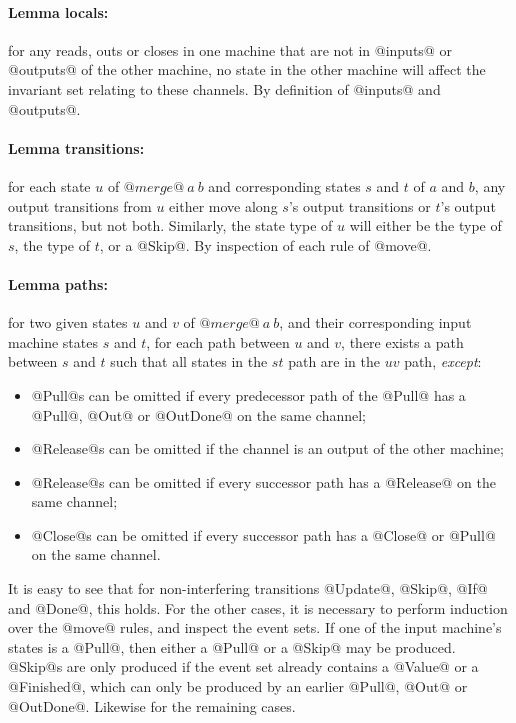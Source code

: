 \paragraph{Lemma locals:} for any reads, outs or closes in one machine that are not in @inputs@ or @outputs@ of the other machine, no state in the other machine will affect the invariant set relating to these channels.
By definition of @inputs@ and @outputs@.

\paragraph{Lemma transitions:} for each state $u$ of $@merge@~a~b$ and corresponding states $s$ and $t$ of $a$ and $b$, any output transitions from $u$ either move along $s$'s output transitions or $t$'s output transitions, but not both.
Similarly, the state type of $u$ will either be the type of $s$, the type of $t$, or a @Skip@.
By inspection of each rule of @move@.

\paragraph{Lemma paths:} for two given states $u$ and $v$ of $@merge@~a~b$, and their corresponding input machine states $s$ and $t$, for each path between $u$ and $v$, there exists a path between $s$ and $t$ such that all states in the $st$ path are in the $uv$ path, \emph{except}:
\begin{itemize}
\item @Pull@s can be omitted if every predecessor path of the @Pull@ has a @Pull@, @Out@ or @OutDone@ on the same channel;
\item @Release@s can be omitted if the channel is an output of the other machine;
\item @Release@s can be omitted if every successor path has a @Release@ on the same channel;
\item @Close@s can be omitted if every successor path has a @Close@ or @Pull@ on the same channel.
\end{itemize}

It is easy to see that for non-interfering transitions @Update@, @Skip@, @If@ and @Done@, this holds.
For the other cases, it is necessary to perform induction over the @move@ rules, and inspect the event sets.
If one of the input machine's states is a @Pull@, then either a @Pull@ or a @Skip@ may be produced.
@Skip@s are only produced if the event set already contains a @Value@ or a @Finished@, which can only be produced by an earlier @Pull@, @Out@ or @OutDone@.
Likewise for the remaining cases.


